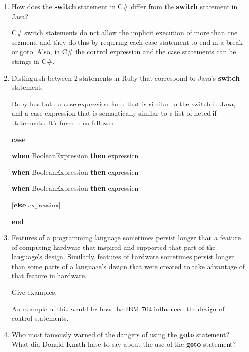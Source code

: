 \begin{enumerate}
  \item How does the \textbf{switch} statement in C\#
    differ from the \textbf{switch} statement in Java?

  \begin{answer}
    C\# switch statements do not allow the implicit execution of more than one segment, and they do this by requiring each case statement to end in a break or goto. Also, in C\# the control expression and the case statements can be strings in C\#.
  \end{answer}

  \item Distinguish between 2 statements in Ruby
    that correspond to Java's \textbf{switch} statement.

  \begin{answer}
   Ruby has both a case expression form that is similar to the switch in Java, and a case expression that is semantically similar to a list of neted if statements. It's form is as follows:

   \textbf{case}

   \textbf{when} BooleanExpression \textbf{then} expression

   \textbf{when} BooleanExpression \textbf{then} expression

   \textbf{when} BooleanExpression \textbf{then} expression

   [\textbf{else} expression]

   \textbf{end}

  \end{answer}


  \item Features of a programming language sometimes persist
    longer than a feature of computing hardware that inspired
    and supported that part of the language's design.
    Similarly, features of hardware sometimes persist longer
    than some parts of a language's design that were created
    to take advantage of that feature in hardware.

    Give examples.

  \begin{answer}
   An example of this would be how the IBM 704 influenced the design of control statements.
  \end{answer}

  \item Who most famously warned of the dangers of using the
    \textbf{goto} statement? What did Donald Knuth have to
    say about the use of the \textbf{goto} statement?


\end{enumerate}
